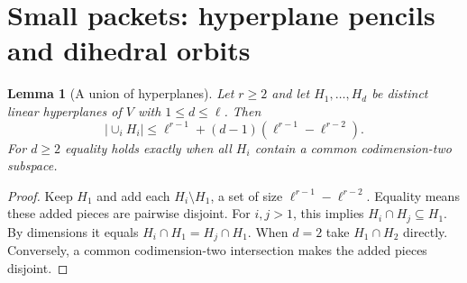 \documentclass[11pt]{article}
\newtheorem{lemma}[theorem]{Lemma}
\theoremstyle{remark}\newtheorem{remark}[theorem]{Remark}
\begin{document}
\section{Small packets: hyperplane pencils and dihedral orbits}
\begin{lemma}[A union of hyperplanes]\label{lem:union}
Let $r\ge2$ and let $H_1,\dots,H_d$ be distinct linear hyperplanes of $V$ with $1\le d\le\ell$. Then
\begin{equation}\label{eq:union}
 |\cup_iH_i|\le \ell^{r-1}+(d-1)(\ell^{r-1}-\ell^{r-2}).
\end{equation}
For $d\ge2$ equality holds exactly when all $H_i$ contain a common codimension-two subspace.
\end{lemma}
\begin{proof}
Keep $H_1$ and add each $H_i\setminus H_1$, a set of size $\ell^{r-1}-\ell^{r-2}$. Equality means these added pieces are pairwise disjoint. For $i,j>1$, this implies $H_i\cap H_j\subseteq H_1$. By dimensions it equals $H_i\cap H_1=H_j\cap H_1$. When $d=2$ take $H_1\cap H_2$ directly. Conversely, a common codimension-two intersection makes the added pieces disjoint.
\end{proof}
\end{document}
